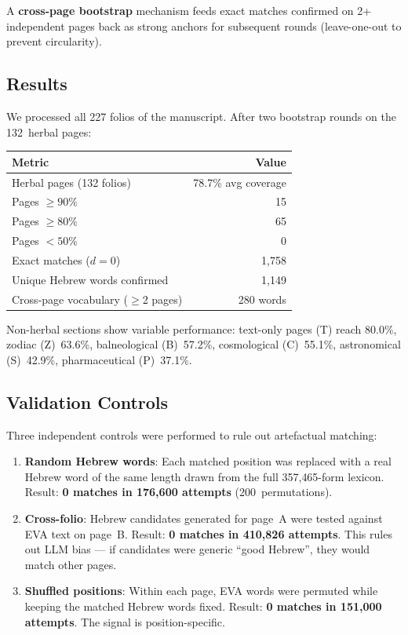 \documentclass[11pt,a4paper]{article}
\begin{document}
A \textbf{cross-page bootstrap} mechanism feeds exact matches confirmed
on 2+ independent pages back as strong anchors for subsequent rounds
(leave-one-out to prevent circularity).

\subsection{Results}

We processed all 227 folios of the manuscript. After two bootstrap rounds
on the 132~herbal pages:

\begin{center}
\begin{tabular}{lr}
\toprule
Metric & Value \\
\midrule
Herbal pages (132 folios) & 78.7\% avg coverage \\
Pages $\geq 90\%$ & 15 \\
Pages $\geq 80\%$ & 65 \\
Pages $< 50\%$ & 0 \\
Exact matches ($d=0$) & 1{,}758 \\
Unique Hebrew words confirmed & 1{,}149 \\
Cross-page vocabulary ($\geq$2 pages) & 280 words \\
\bottomrule
\end{tabular}
\end{center}

Non-herbal sections show variable performance: text-only pages (T) reach
80.0\%, zodiac (Z)~63.6\%, balneological (B)~57.2\%, cosmological (C)~55.1\%,
astronomical (S)~42.9\%, pharmaceutical (P)~37.1\%.

\subsection{Validation Controls}

Three independent controls were performed to rule out artefactual matching:

\begin{enumerate}
\item \textbf{Random Hebrew words}: Each matched position was replaced with
a real Hebrew word of the same length drawn from the full 357{,}465-form
lexicon. Result: \textbf{0 matches in 176{,}600 attempts} (200~permutations).

\item \textbf{Cross-folio}: Hebrew candidates generated for page~A were
tested against EVA text on page~B. Result: \textbf{0 matches in 410{,}826
attempts}. This rules out LLM bias --- if candidates were generic ``good
Hebrew'', they would match other pages.

\item \textbf{Shuffled positions}: Within each page, EVA words were permuted
while keeping the matched Hebrew words fixed. Result: \textbf{0 matches in
151{,}000 attempts}. The signal is position-specific.
\end{enumerate}
\end{document}
